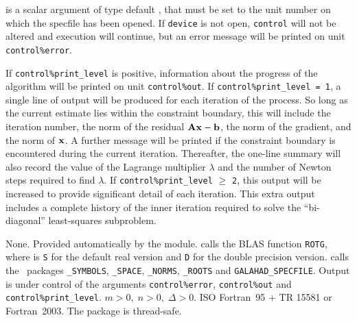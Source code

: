 \documentclass{galahad}
\newcommand{\packagename}{LS\-TR}
\begin{document}
\begin{description}

 is a scalar \intentin argument of type default \integer,
that must be set to the unit number on which the specfile
has been opened. If {\tt device} is not open, {\tt control} will
not be altered and execution will continue, but an error message
will be printed on unit {\tt control\%error}.

\end{description}


\galinfo
If {\tt control\%print\_level} is positive, information about the progress 
of the algorithm will be printed on unit {\tt control\-\%\-out}.
If {\tt control\%print\_level = 1}, a single line of output will be produced  
for each iteration of the process. So long as the current estimate lies 
within the constraint boundary, this will include  
the iteration number, the norm of the residual ${\mathbf{A}}{\mathbf{x}}-{\mathbf{b}}$, the 
norm of the gradient, and the norm of ${\mathbf{x}}$.
A further message will be printed  
if the constraint boundary is encountered during the current iteration.  
Thereafter, the one-line summary will also record the value of the Lagrange
multiplier $\lambda$ and the number of Newton steps required to find $\lambda$.
If {\tt control\%print\_level} $\geq$ {\tt 2}, this  
output will be increased to provide significant detail of each iteration.  
This extra output includes a complete history of the inner iteration required 
to solve the ``bi-diagonal'' least-squares subproblem.


\galgeneral

\galcommon None.
\galworkspace Provided automatically by the module.
\galroutines {\tt \packagename\_solve} calls the
BLAS function {\tt *ROTG}, where {\tt *} is {\tt S} for 
the default real version and {\tt D} for the double precision version.
\galmodules {\tt \packagename\_solve} calls the \galahad\ packages 
{\tt \libraryname\_SY\-M\-BOLS}, 
{\tt \libraryname\_SPACE}, 
{\tt \libraryname\_NORMS}, 
{\tt \libraryname\_\-ROOTS} and
{\tt GALAHAD\_SPECFILE}.
\galio Output is under control of the arguments 
{\tt control\%error}, {\tt control\%out} and {\tt control\%print\_level}.
\galrestrictions $m > 0, \; n  >  0, \;  \Delta  >  0$.
\galportability ISO Fortran~95 + TR 15581 or Fortran~2003.
The package is thread-safe.
\end{document}
